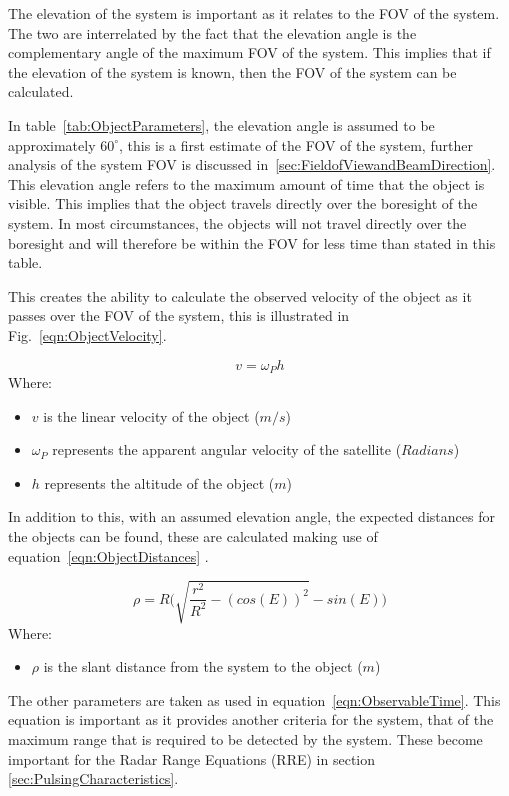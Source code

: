 \documentclass[11pt]{witseiepaper}
\begin{document}
\begin{bibunit}[witseie]
The elevation of the system is important as it relates to the FOV of the system. The two are interrelated by the fact that the elevation angle is the complementary angle of the maximum FOV of the system. This implies that if the elevation of the system is known, then the FOV of the system can be calculated.

In table~\ref{tab:ObjectParameters}, the elevation angle is assumed to be approximately $60^{\circ}$, this is a first estimate of the FOV of the system, further analysis of the system FOV is discussed in~\ref{sec:FieldofViewandBeamDirection}. This elevation angle refers to the maximum amount of time that the object is visible. This implies that the object travels directly over the boresight of the system. In most circumstances, the objects will not travel directly over the boresight and will therefore be within the FOV for less time than stated in this table.

This creates the ability to calculate the observed velocity of the object as it passes over the FOV of the system, this is illustrated in Fig.~\ref{eqn:ObjectVelocity}.

\begin{equation} \label{eqn:ObjectVelocity}
    v = \omega_{P} h
\end{equation}
Where:
\begin{itemize}
    \item $v$ is the linear velocity of the object ($m/s$)
    \item $\omega_{P}$ represents the apparent angular velocity of the satellite ($Radians$)
    \item $h$ represents the altitude of the object ($m$)
\end{itemize}


In addition to this, with an assumed elevation angle, the expected distances for the objects can be found, these are calculated making use of equation~\ref{eqn:ObjectDistances} \cite{ObservableTime}.


\begin{equation} \label{eqn:ObjectDistances}
    \rho = R \Bigg(\sqrt{\frac{r^2}{R^2} - (cos(E))^2} - sin(E) \Bigg)
    \end{equation}
Where:
\begin{itemize}
    \item $\rho$ is the slant distance from the system to the object ($m$)
\end{itemize}
The other parameters are taken as used in equation~\ref{eqn:ObservableTime}.
This equation is important as it provides another criteria for the system, that of the maximum range that is required to be detected by the system. These become important for the Radar Range Equations (RRE) in section \ref{sec:PulsingCharacteristics}.


\end{bibunit}
\end{document}
